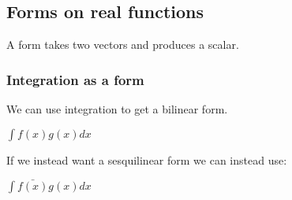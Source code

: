 
\subsection{Forms on real functions}

A form takes two vectors and produces a scalar.

\subsubsection{Integration as a form}

We can use integration to get a bilinear form.

\(\int f(x) g(x) dx\)

If we instead want a sesquilinear form we can instead use:

\(\int \bar {f(x)} g(x) dx\)

